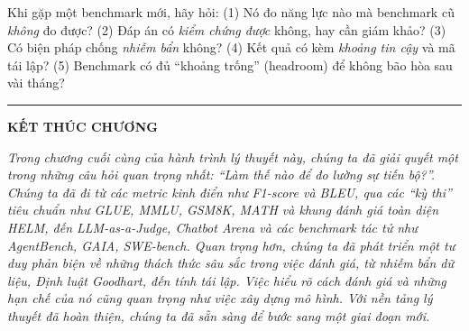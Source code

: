 \begin{tcolorbox}[title={Áp dụng quy tắc của danh sách đọc cho một paper đánh giá}, colback=green!5!white, colframe=green!60!black, fonttitle=\bfseries]
Khi gặp một benchmark mới, hãy hỏi: (1) Nó đo năng lực nào mà benchmark cũ \emph{không} đo được? (2) Đáp án có \emph{kiểm chứng được} không, hay cần giám khảo? (3) Có biện pháp chống \emph{nhiễm bẩn} không? (4) Kết quả có kèm \emph{khoảng tin cậy} và mã tái lập? (5) Benchmark có đủ “khoảng trống” (headroom) để không bão hòa sau vài tháng?
\end{tcolorbox}

\bigskip
\hrule
\bigskip

\begin{center}
    \textbf{\Large KẾT THÚC CHƯƠNG \thechapter}
\end{center}

\textit{Trong chương cuối cùng của hành trình lý thuyết này, chúng ta đã giải quyết một trong những câu hỏi quan trọng nhất: “Làm thế nào để đo lường sự tiến bộ?”. Chúng ta đã đi từ các metric kinh điển như F1-score và BLEU, qua các “kỳ thi” tiêu chuẩn như GLUE, MMLU, GSM8K, MATH và khung đánh giá toàn diện HELM, đến LLM-as-a-Judge, Chatbot Arena và các benchmark tác tử như AgentBench, GAIA, SWE-bench. Quan trọng hơn, chúng ta đã phát triển một tư duy phản biện về những thách thức sâu sắc trong việc đánh giá, từ nhiễm bẩn dữ liệu, Định luật Goodhart, đến tính tái lập. Việc hiểu rõ cách đánh giá và những hạn chế của nó cũng quan trọng như việc xây dựng mô hình. Với nền tảng lý thuyết đã hoàn thiện, chúng ta đã sẵn sàng để bước sang một giai đoạn mới.}
